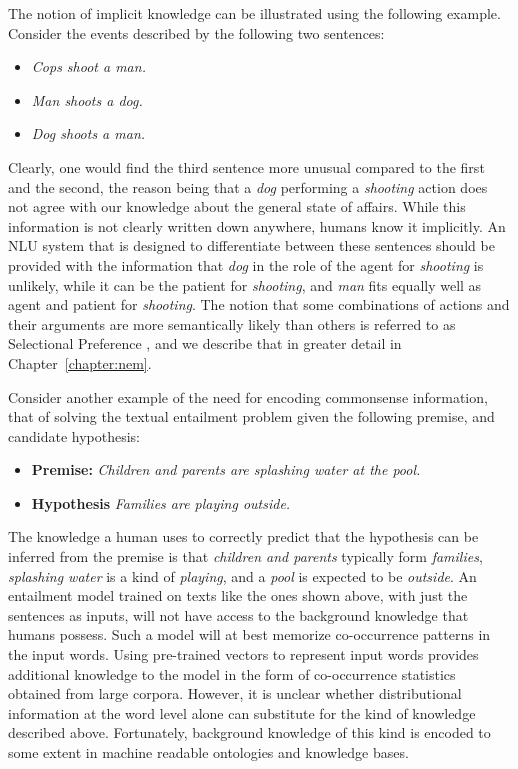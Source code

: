 The notion of implicit knowledge can be illustrated using the following example. Consider the
events described by the following two sentences:

\begin{itemize}
 \item[] \textit{Cops shoot a man.}
 \item[] \textit{Man shoots a dog.}
 \item[] \textit{Dog shoots a man.}
\end{itemize}

Clearly, one would find the third sentence more unusual compared to the first and the second, the reason being that
a \emph{dog} performing a \emph{shooting} action does not agree with our knowledge about the general state
of affairs. While this information is not clearly written down anywhere, humans know it implicitly. An NLU
system that is designed to differentiate between these sentences should be provided with the information
that \emph{dog} in the role of the agent for \emph{shooting} is unlikely, while it can be the patient for
\emph{shooting}, and \emph{man} fits equally well as agent and patient for \emph{shooting}. The notion that
some combinations of actions and their arguments are more semantically likely than others is referred to as
Selectional Preference \citep{wilks1973preference}, and we describe that in greater detail in Chapter~\ref{chapter:nem}.

Consider another example of the need for encoding commonsense information, that of solving the 
textual entailment problem given the following premise, and candidate hypothesis:
\begin{itemize}
 \item[] \textbf{Premise:} \textit{Children and parents are splashing water at the pool.}
 \item[] \textbf{Hypothesis} \textit{Families are playing outside.}
\end{itemize}
The knowledge a human uses to correctly predict that the hypothesis can be inferred from the 
premise is that \textit{children and parents} typically form \textit{families}, \textit{splashing water} 
is a kind of \textit{playing}, and a \textit{pool} is expected to be \textit{outside}. An entailment model trained on texts like the
ones shown above, with just the sentences as inputs, will not have access to the background knowledge that humans possess.
Such a model will at best memorize co-occurrence patterns in the input words. Using pre-trained vectors to represent input words provides additional
knowledge to the model in the form of co-occurrence statistics obtained from large corpora. However, it is unclear whether distributional
information at the word level alone can substitute for the kind of knowledge described above.
Fortunately, background knowledge of this kind is encoded to some extent in machine readable
ontologies and knowledge bases.

